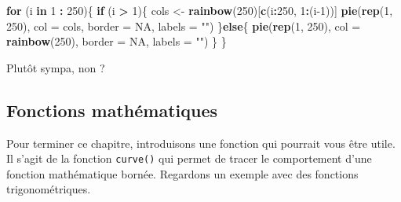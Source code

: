 \documentclass[]{article}
\newenvironment{Shaded}{\begin{snugshade}}{\end{snugshade}}
\newcommand{\ControlFlowTok}[1]{\textcolor[rgb]{0.13,0.29,0.53}{\textbf{#1}}}
\newcommand{\DataTypeTok}[1]{\textcolor[rgb]{0.13,0.29,0.53}{#1}}
\newcommand{\DecValTok}[1]{\textcolor[rgb]{0.00,0.00,0.81}{#1}}
\newcommand{\KeywordTok}[1]{\textcolor[rgb]{0.13,0.29,0.53}{\textbf{#1}}}
\newcommand{\NormalTok}[1]{#1}
\newcommand{\OperatorTok}[1]{\textcolor[rgb]{0.81,0.36,0.00}{\textbf{#1}}}
\newcommand{\OtherTok}[1]{\textcolor[rgb]{0.56,0.35,0.01}{#1}}
\newcommand{\StringTok}[1]{\textcolor[rgb]{0.31,0.60,0.02}{#1}}
\begin{document}
\begin{Shaded}
\begin{Highlighting}[]
\ControlFlowTok{for}\NormalTok{ (i }\ControlFlowTok{in} \DecValTok{1} \OperatorTok{:}\StringTok{ }\DecValTok{250}\NormalTok{)\{}
  \ControlFlowTok{if}\NormalTok{ (i }\OperatorTok{>}\StringTok{ }\DecValTok{1}\NormalTok{)\{}
\NormalTok{    cols <-}\StringTok{ }\KeywordTok{rainbow}\NormalTok{(}\DecValTok{250}\NormalTok{)[}\KeywordTok{c}\NormalTok{(i}\OperatorTok{:}\DecValTok{250}\NormalTok{, }\DecValTok{1}\OperatorTok{:}\NormalTok{(i}\DecValTok{-1}\NormalTok{))]}
    \KeywordTok{pie}\NormalTok{(}\KeywordTok{rep}\NormalTok{(}\DecValTok{1}\NormalTok{, }\DecValTok{250}\NormalTok{), }\DataTypeTok{col =}\NormalTok{ cols, }\DataTypeTok{border =} \OtherTok{NA}\NormalTok{, }\DataTypeTok{labels =} \StringTok{""}\NormalTok{)}
\NormalTok{  \}}\ControlFlowTok{else}\NormalTok{\{}
    \KeywordTok{pie}\NormalTok{(}\KeywordTok{rep}\NormalTok{(}\DecValTok{1}\NormalTok{, }\DecValTok{250}\NormalTok{), }\DataTypeTok{col =} \KeywordTok{rainbow}\NormalTok{(}\DecValTok{250}\NormalTok{), }\DataTypeTok{border =} \OtherTok{NA}\NormalTok{, }\DataTypeTok{labels =} \StringTok{""}\NormalTok{)}
\NormalTok{  \}}
\NormalTok{\}}
\end{Highlighting}
\end{Shaded}

Plutôt sympa, non ?

\hypertarget{fonctions-mathuxe9matiques}{%
\subsection{Fonctions mathématiques}\label{fonctions-mathuxe9matiques}}

Pour terminer ce chapitre, introduisons une fonction qui pourrait vous être utile. Il s'agit de la fonction \texttt{curve()} qui permet de tracer le comportement d'une fonction mathématique bornée. Regardons un exemple avec des fonctions trigonométriques.
\end{document}
